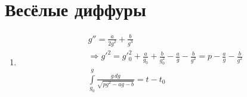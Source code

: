 \section{Весёлые диффуры}

\begin{enumerate}
	\item
		\[
			\begin{aligned}
				& g'' = \frac{a}{2g^2} + \frac{b}{g^3} \\
				& \Rightarrow g'^2 = g'^2_0 + \frac{a}{g_0} + \frac{b}{g^2_0} - \frac{a}{g} - \frac{b}{g^2} =
				p - \frac{a}{g} - \frac{b}{g^2} \\
				& \int\limits_{g_0}^{g} \frac{g\,dg}{\sqrt{pg^2 - ag - b}} = t - t_0
			\end{aligned}
		\]
\end{enumerate}